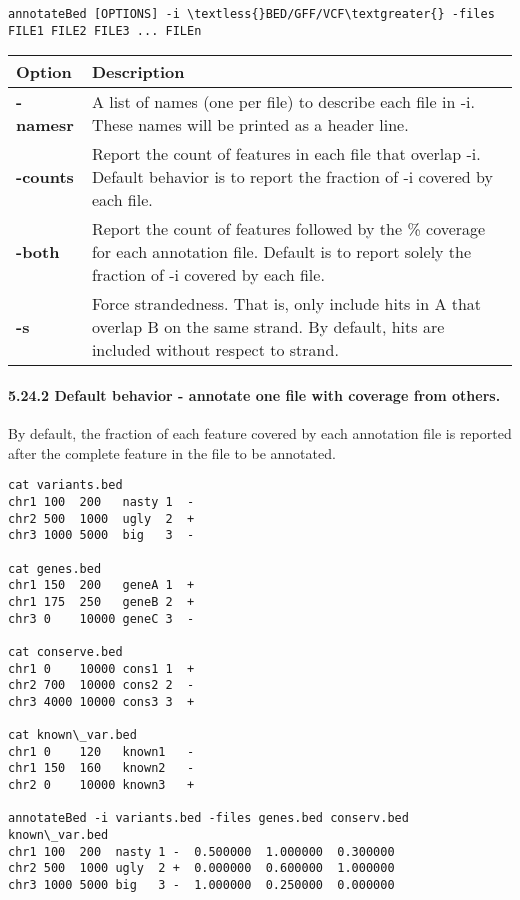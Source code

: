 \documentclass[letterpaper,10pt,english]{sphinxmanual}
\begin{document}
\begin{Verbatim}[commandchars=\\\{\}]
annotateBed [OPTIONS] -i \textless{}BED/GFF/VCF\textgreater{} -files FILE1 FILE2 FILE3 ... FILEn
\end{Verbatim}

\begin{tabulary}{\linewidth}{|L|L|}
\hline
\textbf{
Option
} & \textbf{
Description
}\\\hline

\textbf{-namesr}
 & 
A list of names (one per file) to describe each file in -i. These names will be printed as a header line.
\\\hline

\textbf{-counts}
 & 
Report the count of features in each file that overlap -i. Default behavior is to report the fraction of -i covered by each file.
\\\hline

\textbf{-both}
 & 
Report the count of features followed by the \% coverage for each annotation file. Default is to report solely the fraction of -i covered by each file.
\\\hline

\textbf{-s}
 & 
Force strandedness. That is, only include hits in A that overlap B on the same strand. By default, hits are included without respect to strand.
\\\hline
\end{tabulary}



\paragraph{5.24.2 Default behavior - annotate one file with coverage from others.}
\label{content/annotateBed:default-behavior-annotate-one-file-with-coverage-from-others}
By default, the fraction of each feature covered by each annotation file is reported after the complete
feature in the file to be annotated.

\begin{Verbatim}[commandchars=\\\{\}]
cat variants.bed
chr1 100  200   nasty 1  -
chr2 500  1000  ugly  2  +
chr3 1000 5000  big   3  -

cat genes.bed
chr1 150  200   geneA 1  +
chr1 175  250   geneB 2  +
chr3 0    10000 geneC 3  -

cat conserve.bed
chr1 0    10000 cons1 1  +
chr2 700  10000 cons2 2  -
chr3 4000 10000 cons3 3  +

cat known\_var.bed
chr1 0    120   known1   -
chr1 150  160   known2   -
chr2 0    10000 known3   +

annotateBed -i variants.bed -files genes.bed conserv.bed known\_var.bed
chr1 100  200  nasty 1 -  0.500000  1.000000  0.300000
chr2 500  1000 ugly  2 +  0.000000  0.600000  1.000000
chr3 1000 5000 big   3 -  1.000000  0.250000  0.000000
\end{Verbatim}
\end{document}

